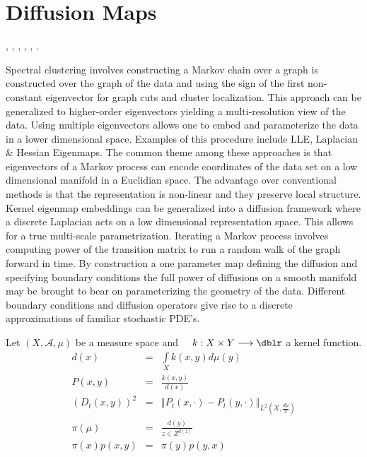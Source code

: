\documentclass[a4paper]{article}
\newcommand{\norm}[1]{\left\Vert#1\right\Vert}
\theoremstyle{plain}
\theoremstyle{definition}
\theoremstyle{remark}
\numberwithin{equation}{section}
\begin{document}
\section{Diffusion Maps}
\cite{DMBremerabstractdiffusion}, \cite{DMCarnegieinformationdiffusion}, \cite{DMCoifmandiffusionmaps},
\cite{DMKubota00reactiondiffusionsystems}, \cite{DMLafferty05diffusionkernels},
\cite{DMNadler06diffusionmaps}.

Spectral clustering involves constructing a Markov chain over a graph is constructed over the graph of the data and using the sign of the first non-constant eigenvector for graph cuts and cluster localization.  This approach can be generalized to higher-order eigenvectors yielding a multi-resolution view of the data. Using multiple eigenvectors allows one to embed and parameterize the data in a lower dimensional space.  Examples of this procedure include LLE, Laplacian \& Hessian Eigenmaps.  The common theme among these approaches is that eigenvectors of a Markov process can encode coordinates of the data set on a low dimensional manifold in a Euclidian space.  The advantage over conventional methods is that the representation is non-linear and they preserve local structure. Kernel eigenmap embeddings can be generalized into a diffusion  framework where a discrete Laplacian acts on a low dimensional representation space.  This allows for a true multi-scale parametrization.  Iterating a Markov process involves computing power of the transition matrix to run a random walk of the graph forward in time.   By construction a one parameter map defining the diffusion and specifying boundary conditions the full power of diffusions on a smooth manifold may be brought to bear on parameterizing the geometry of the data.  Different boundary conditions and diffusion operators give rise to a discrete approximations of familiar stochastic PDE's.

Let $(X,\mathcal{A},\mu)$ be a measure space and $\quad k: X \times Y \longrightarrow \dblr $ a kernel function.
 \begin{eqnarray}
 d(x) &=& \int\limits_{X} k(x,y) d \mu(y)  \\
 P(x,y) &=& \frac{ k(x,y) }{ d(x) }    \\
 (D_t (x,y))^2 &=& \norm{P_t(x, \cdot) - P_t(y,\cdot )}_{ L^2(X,\frac{d\mu}{\pi}) }  \\
 \pi(\mu) &=&  \frac{d(y)}{z \in Z^{d(z)} } \\
 \pi(x) p(x,y) &=& \pi(y) p(y,x)
 \end{eqnarray}
\end{document}
